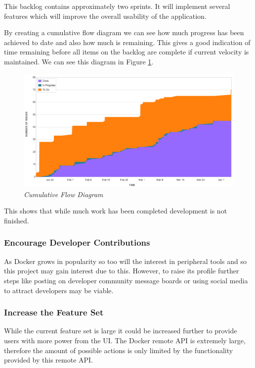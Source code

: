 This backlog contains approximately two sprints. It will implement several features which will improve the overall usability of the application. 

By creating a cumulative flow diagram we can see how much progress has been achieved to date and also how much is remaining. This gives a good indication of time remaining before all items on the backlog are complete if current velocity is maintained. We can see this diagram in Figure \ref{fig:cumulative_flow}.

\clearpage

\begin{figure}[!ht]
	\centering
	\includegraphics*[width=\textwidth]{images/cumulative_flow}
	\caption{\em Cumulative Flow Diagram}
	\label{fig:cumulative_flow}
\end{figure}

This shows that while much work has been completed development is not finished.

\subsubsection{Encourage Developer Contributions}
As Docker grows in popularity so too will the interest in peripheral tools and so this project may gain interest due to this. However, to raise its profile further steps like posting on developer community message boards or using social media to attract developers may be viable.

\subsubsection{Increase the Feature Set}
While the current feature set is large it could be increased further to provide users with more power from the UI. The Docker remote API is extremely large, therefore the amount of possible actions is only limited by the functionality provided by this remote API.
